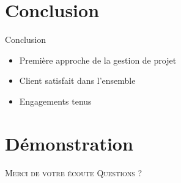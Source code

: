 \documentclass{cubeamer}
\begin{document}
\section{Conclusion}

\begin{frame}{Conclusion}
    \begin{itemize}
        \item Première approche de la gestion de projet 
        \item Client satisfait dans l'ensemble
        \item Engagements tenus
    \end{itemize}
\end{frame}

\section*{Démonstration}

\begin{frame}[standout]
    \Huge\textsc{Merci de votre écoute}
    \vfill
    \LARGE\textsc{Questions ?}
\end{frame}
\end{document}
